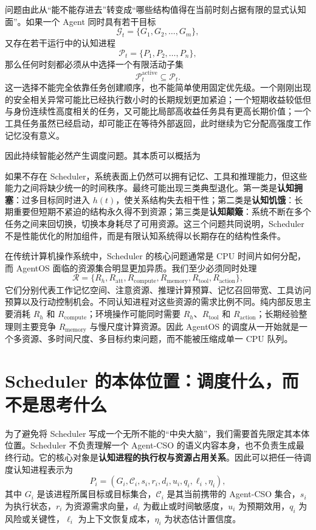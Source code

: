 问题由此从“能不能存进去”转变成“哪些结构值得在当前时刻占据有限的显式认知面”。如果一个 Agent 同时具有若干目标
\[
\mathcal G_t=\{G_1,G_2,\ldots,G_m\},
\]
又存在若干运行中的认知进程
\[
\mathcal P_t=\{P_1,P_2,\ldots,P_n\},
\]
那么任何时刻都必须从中选择一个有限活动子集
\[
\mathcal P_t^{\mathrm{active}}\subseteq\mathcal P_t.
\]
这一选择不能完全依靠任务创建顺序，也不能简单使用固定优先级。一个刚刚出现的安全相关异常可能比已经执行数小时的长期规划更加紧迫；一个短期收益较低但与身份连续性高度相关的任务，又可能比局部高收益任务具有更高长期价值；一个工具任务虽然已经启动，却可能正在等待外部返回，此时继续为它分配高强度工作记忆没有意义。

因此持续智能必然产生调度问题。其本质可以概括为
\begin{statementbox}
\centering
{}
\end{statementbox}
如果不存在 Scheduler，系统表面上仍然可以拥有记忆、工具和推理能力，但这些能力之间将缺少统一的时间秩序。最终可能出现三类典型退化。第一类是\textbf{认知拥塞}：过多目标同时进入 $h(t)$，使关系结构失去相干性；第二类是\textbf{认知饥饿}：长期重要但短期不紧迫的结构永久得不到资源；第三类是\textbf{认知颠簸}：系统不断在多个任务之间来回切换，切换本身耗尽了可用资源。这三个问题共同说明，Scheduler 不是性能优化的附加组件，而是有限认知系统得以长期存在的结构性条件。

在传统计算机操作系统中，Scheduler 的核心问题通常是 CPU 时间片如何分配，而 AgentOS 面临的资源集合明显更加异质。我们至少必须同时处理
\[
\mathcal R=
\{
R_h,
R_{\mathrm{att}},
R_{\mathrm{compute}},
R_{\mathrm{memory}},
R_{\mathrm{tool}},
R_{\mathrm{action}}
\},
\]
它们分别代表工作记忆空间、注意资源、推理计算预算、记忆召回带宽、工具访问预算以及行动控制机会。不同认知进程对这些资源的需求比例不同。纯内部反思主要消耗 $R_h$ 和 $R_{\mathrm{compute}}$；环境操作可能同时需要 $R_h$、$R_{\mathrm{tool}}$ 和 $R_{\mathrm{action}}$；长期经验整理则主要竞争 $R_{\mathrm{memory}}$ 与慢尺度计算资源。因此 AgentOS 的调度从一开始就是一个多资源、多时间尺度、多目标约束问题，而不能被压缩成单一 CPU 队列。

\section{Scheduler 的本体位置：调度什么，而不是思考什么}

为了避免将 Scheduler 写成一个无所不能的“中央大脑”，我们需要首先限定其本体位置。Scheduler 不负责理解一个 Agent-CSO 的语义内容本身，也不负责生成最终行动。它的核心对象是\textbf{认知进程的执行权与资源占用关系}。因此可以把任一待调度认知进程表示为
\[
P_i=
(
G_i,
\mathcal C_i,
s_i,
r_i,
d_i,
u_i,
q_i,
\ell_i,
\eta_i
),
\]
其中 $G_i$ 是该进程所属目标或目标集合，$\mathcal C_i$ 是其当前携带的 Agent-CSO 集合，$s_i$ 为执行状态，$r_i$ 为资源需求向量，$d_i$ 为截止或时间敏感度，$u_i$ 为预期效用，$q_i$ 为风险或关键性，$\ell_i$ 为上下文恢复成本，$\eta_i$ 为状态估计置信度。

